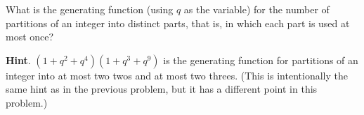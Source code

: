 \documentclass{book}
\begin{document}
\setcounter{cpjt}{322}
\addtocounter{cpjt}{-1}
\begin{activity}\label{activity-315}
\hypertarget{p-1598}{}%
What is the generating function (using \(q\) as the variable) for the number of partitions of an integer into distinct parts, that is, in which each part is used at most once?%
\par\smallskip%
\noindent\textbf{Hint}.\hypertarget{hint-213}{}\quad%
\hypertarget{p-1599}{}%
\((1 + q^2 + q^4 )(1 + q^3 + q^9 )\) is the generating function for partitions of an integer into at most two twos and at most two threes. (This is intentionally the same hint as in the previous problem, but it has a different point in this problem.)%
\par\smallskip%
\noindent\end{activity}

\clearpage
\end{document}
